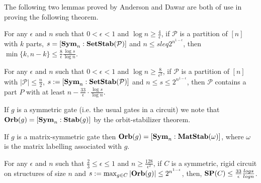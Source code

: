 \documentclass[../paper.tex]{subfiles}
\begin{document}
The following two lemmas proved by Anderson and Dawar \cite{AndersonD17} are
both of use in proving the following theorem.

\begin{lem}
  \label{lem:big-or-small}
  For any $\epsilon$ and $n$ such that $0 < \epsilon < 1$ and $\log n \geq
  \frac{4}{\epsilon}$, if $\mathcal{P}$ is a partition of $[n]$ with $k$ parts,
  $s = [\text{\textbf{Sym}}_n : \text{\textbf{SetStab}} (\mathcal{P})]$ and $n \leq s leq 2^{n^{1-\epsilon}}$,
  then $\min \{k, n-k\} \leq \frac{8}{\epsilon} \frac{\log s}{\log n}$.
\end{lem}

\begin{lem}
  \label{lem:small-means-support}
  For any $\epsilon$ and $n$ such that $0 < \epsilon < 1$ and $\log n \geq
  \frac{8}{\epsilon^2}$, if $\mathcal{P}$ is a partition of $[n]$ with $\vert
  \mathcal{P} \vert \leq \frac{n}{2}$, $s:= [\text{\textbf{Sym}}_n : \text{\textbf{SetStab}} (\mathcal{P})]$
  and $n \leq s \leq 2^{n^{1-\epsilon}}$, then $\mathcal{P}$ contains a part $P$
  with at least $n - \frac{33}{\epsilon} \cdot \frac{\log s} {\log n}$.
\end{lem}

If $g$ is a symmetric gate (i.e. the usual gates in a circuit) we note that
$\text{\textbf{Orb}}(g) = [\text{\textbf{Sym}}_n : \text{\textbf{Stab}} (g)]$ by the orbit-stabilizer theorem.

If $g$ is a matrix-symmetric gate then $\text{\textbf{Orb}}(g) = [\text{\textbf{Sym}}_n:\text{\textbf{MatStab}} (\omega)]$,
where $\omega$ is the matrix labelling associated with $g$.



\begin{thm}
  \label{thm:support_thm}
  For any $\epsilon$ and $n$ such that $\frac{2}{3} \leq \epsilon \leq 1$ and $n
  \geq \frac{128}{\epsilon^2}$, if $C$ is a symmetric, rigid circuit on
  structures of size $n$ and $s := \max_{g \in C} \vert \text{\textbf{Orb}} (g)\vert \leq
  2^{n^{1-\epsilon}}$, then, $\text{\textbf{SP}}(C) \leq \frac{33}{\epsilon}\frac{log s}{log
    n}$.
\end{thm}
\end{document}
